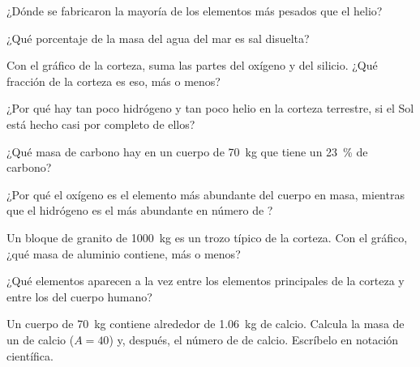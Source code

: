 \begin{exercise}[$\star$]\label{exo:g9:elements-universe-earth:3}
¿Dónde se fabricaron la mayoría de los elementos más pesados que el
helio?
\end{exercise}

\begin{exercise}[$\star$]\label{exo:g9:elements-universe-earth:4}
¿Qué porcentaje de la masa del agua del mar es sal disuelta?
\end{exercise}

\begin{exercise}[$\star\star$]\label{exo:g9:elements-universe-earth:5}
Con el gráfico de la corteza, suma las partes del oxígeno y del
silicio. ¿Qué fracción de la corteza es eso, más o menos?
\end{exercise}

\begin{exercise}[$\star\star$]\label{exo:g9:elements-universe-earth:6}
¿Por qué hay tan poco hidrógeno y tan poco helio en la corteza
terrestre, si el Sol está hecho casi por completo de ellos?
\end{exercise}

\begin{exercise}[$\star\star$]\label{exo:g9:elements-universe-earth:7}
¿Qué masa de carbono hay en un cuerpo de \qty{70}{kg} que tiene un
\qty{23}{\percent} de carbono?
\end{exercise}

\begin{exercise}[$\star\star$]\label{exo:g9:elements-universe-earth:8}
¿Por qué el oxígeno es el elemento más abundante del cuerpo en masa,
mientras que el hidrógeno es el más abundante en número de ?
\end{exercise}

\begin{exercise}[$\star\star$]\label{exo:g9:elements-universe-earth:9}
Un bloque de granito de \qty{1000}{kg} es un trozo típico de la corteza.
Con el gráfico, ¿qué masa de aluminio contiene, más o menos?
\end{exercise}

\begin{exercise}[$\star\star$]\label{exo:g9:elements-universe-earth:10}
¿Qué elementos aparecen a la vez entre los elementos principales de la
corteza y entre los del cuerpo humano?
\end{exercise}

\begin{exercise}[$\star\star\star$]\label{exo:g9:elements-universe-earth:11}
Un cuerpo de \qty{70}{kg} contiene alrededor de \qty{1.06}{kg} de
calcio. Calcula la masa de un  de calcio ($A = 40$) y, después, el
número de  de calcio. Escríbelo en notación científica.
\end{exercise}


